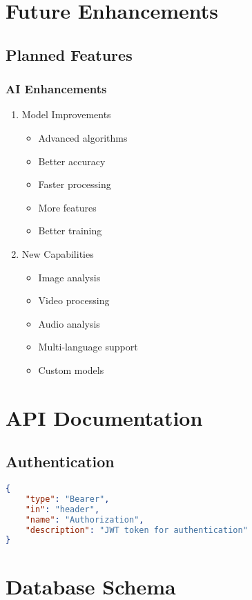 \documentclass[12pt,a4paper]{report}
\begin{document}
\chapter{Future Enhancements}
\section{Planned Features}
\subsection{AI Enhancements}
\begin{enumerate}
    \item Model Improvements
    \begin{itemize}
        \item Advanced algorithms
        \item Better accuracy
        \item Faster processing
        \item More features
        \item Better training
    \end{itemize}
    
    \item New Capabilities
    \begin{itemize}
        \item Image analysis
        \item Video processing
        \item Audio analysis
        \item Multi-language support
        \item Custom models
    \end{itemize}
\end{enumerate}

\appendix
\chapter{API Documentation}
\section{Authentication}
\begin{lstlisting}[language=JSON]
{
    "type": "Bearer",
    "in": "header",
    "name": "Authorization",
    "description": "JWT token for authentication"
}
\end{lstlisting}

\chapter{Database Schema}
\end{document}
